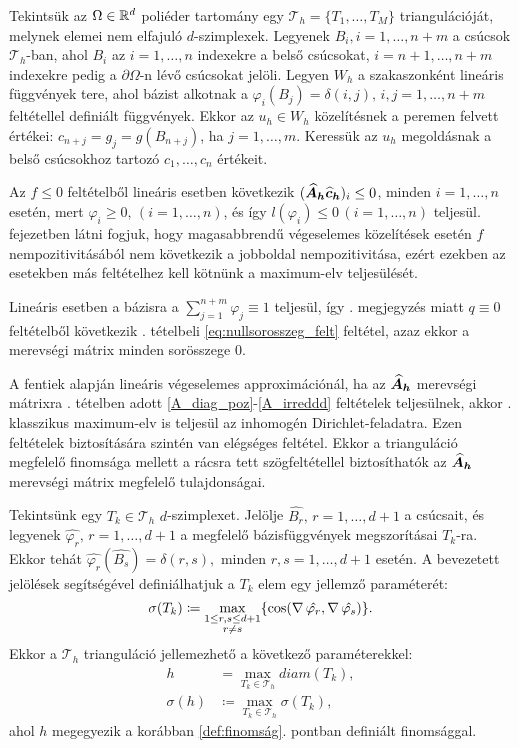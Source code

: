 Tekintsük az $\Omega \in \mathbb{R}^d$ poliéder tartomány egy $\mathcal{T}_h = \{ T_1, \ldots, T_M \}$  triangulációját, melynek elemei nem elfajuló $d$-szimplexek. Legyenek  $B_i, i=1, \ldots, n+m$ a csúcsok $\mathcal{T}_h$-ban, ahol $B_i$ az $i=1, \ldots, n$ indexekre a belső csúcsokat, $i = n+1, \ldots, n+m$ indexekre pedig a $\partial\Omega$-n lévő csúcsokat jelöli. Legyen $W_h$  a szakaszonként lineáris függvények tere, ahol  bázist alkotnak a $\varphi_i(B_j) = \delta(i,j), \,  i,j=1, \ldots, n+m$  feltétellel definiált függvények. Ekkor az $u_h \in W_h$ közelítésnek a peremen felvett értékei: $c_{n+j} = g_j = g(B_{n+j})$, ha $ j = 1, \ldots, m$. Keressük az $u_h$ megoldásnak a  belső csúcsokhoz tartozó $c_1, \ldots, c_n$  értékeit.

Az $f \leq 0$ feltételből lineáris esetben következik $(\bm{\widehat{A}_h} \bm{\widehat{c}_h})_i \leq 0 $, minden $i = 1, \ldots, n$ esetén, mert $ \varphi_i \geq 0, \, (i = 1, \ldots, n)$, és így $l(\varphi_i) \leq 0 \, (i = 1, \ldots, n)$ teljesül.  fejezetben látni fogjuk, hogy  magasabbrendű végeselemes közelítések esetén $f$ nempozitivitásából nem következik a jobboldal nempozitivitása, ezért ezekben az esetekben más feltételhez kell kötnünk a maximum-elv teljesülését.

Lineáris esetben a  bázisra a $\sum_{j = 1}^{n+m}\varphi_{j} \equiv 1 $   teljesül, így . megjegyzés miatt $q \equiv 0$ feltételből következik  . tételbeli \eqref{eq:nullsorosszeg_felt} feltétel, azaz ekkor a merevségi mátrix minden sorösszege $0$.

A fentiek alapján lineáris végeselemes approximációnál, ha az $\bm{\widehat{A}_h}$ merevségi mátrixra . tételben adott  \ref{A_diag_poz}-\ref{A_irreddd} feltételek teljesülnek, akkor . klasszikus maximum-elv is teljesül az inhomogén Dirichlet-feladatra. Ezen feltételek biztosítására szintén van elégséges feltétel. Ekkor a trianguláció megfelelő finomsága mellett a rácsra tett szögfeltétellel biztosíthatók az  $\bm{\widehat{A}_h}$ merevségi mátrix megfelelő tulajdonságai.

Tekintsünk egy $T_k \in \mathcal{T}_h$ $d$-szimplexet. Jelölje $\hat{B_r}, \, r = 1, \ldots, d+1$ a csúcsait, és legyenek  $\hat{\varphi_r}, \, r = 1, \ldots, d+1$ a megfelelő bázisfüggvények megszorításai $T_k$-ra. Ekkor tehát $\hat{\varphi_r}(\hat{B_s}) = \delta(r,s), $ minden $ r,s = 1, \ldots, d+1$ esetén. A bevezetett jelölések segítségével definiálhatjuk a $T_k$ elem egy jellemző paraméterét:
\begin{equation*}
	\sigma(T_k) \coloneqq  \max_{\substack{1 \leq r,s \leq d+1 \\ r \neq s}}\{  \cos (\operatorname{\nabla} \hat{\varphi_r}, \operatorname{\nabla} \hat{\varphi_s}) \}.	
\end{equation*}
Ekkor a $\mathcal{T}_h $ trianguláció jellemezhető  a következő paraméterekkel: 
\begin{align*}
	 h &=  \max_{T_k \in \mathcal{T}_h} diam(T_k),	\\	
	 \sigma(h) &\coloneqq  \max_{T_k \in \mathcal{T}_h} \sigma(T_k),		
\end{align*}
ahol $h$ megegyezik a korábban \ref{def:finomság}. pontban definiált finomsággal. 

